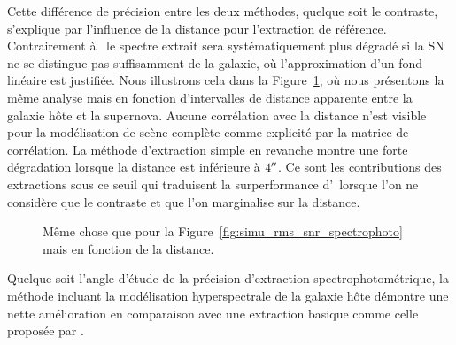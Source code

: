 \documentclass[../main/main.tex]{subfiles}
\begin{document}
Cette différence de précision entre les deux méthodes, quelque soit le
contraste, s'explique par l'influence de la distance pour l'extraction
de référence. Contrairement à \hypergal\, le spectre extrait sera
systématiquement plus dégradé si la SN ne se distingue pas suffisamment
de la galaxie, où l'approximation d'un fond linéaire est justifiée.
Nous illustrons cela dans la
Figure~\ref{fig:simu_rms_dist_spectrophoto}, où nous présentons la même
analyse mais en fonction d'intervalles de distance apparente entre la
galaxie hôte et la supernova. Aucune corrélation avec la
distance n'est visible pour la modélisation de scène complète comme
explicité par la matrice de corrélation. La méthode d'extraction simple en revanche montre une
forte dégradation lorsque la distance est inférieure à
$4^{\prime\prime}$. Ce sont les contributions des extractions sous ce seuil qui
traduisent la surperformance d'\hypergal\ lorsque l'on ne
considère que le contraste et que l'on marginalise sur la distance.

\begin{figure}[ht]
  \centering
  \caption[Distribution du RMS spectral en fonction de la distance
  hôte/SN.]{Même chose que pour la
    Figure~\ref{fig:simu_rms_snr_spectrophoto} mais en fonction de la distance.}
  \label{fig:simu_rms_dist_spectrophoto}
\end{figure}

Quelque soit l'angle d'étude de la précision d'extraction spectrophotométrique,
la méthode incluant la modélisation hyperspectrale de la galaxie hôte
démontre une nette amélioration en comparaison avec une extraction
basique comme celle proposée par \pysedm.
\end{document}
